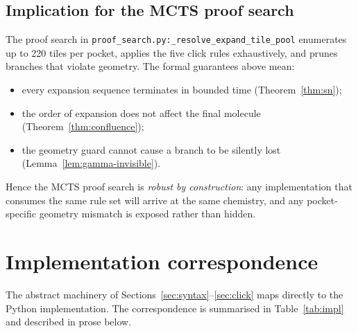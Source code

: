\documentclass{article}
\theoremstyle{definition}
\begin{document}
\subsection{Implication for the MCTS proof search}
The proof search in \texttt{proof\_search.py:\_resolve\_expand\_tile\_pool}
enumerates up to 220 tiles per pocket, applies the five click rules
exhaustively, and prunes branches that violate geometry. The
formal guarantees above mean:
\begin{itemize}
  \item every expansion sequence terminates in bounded time
        (Theorem~\ref{thm:sn});
  \item the order of expansion does not affect the final molecule
        (Theorem~\ref{thm:confluence});
  \item the geometry guard cannot cause a branch to be silently lost
        (Lemma~\ref{lem:gamma-invisible}).
\end{itemize}
Hence the MCTS proof search is \emph{robust by construction}: any
implementation that consumes the same rule set will arrive at the same
chemistry, and any pocket-specific geometry mismatch is exposed rather
than hidden.

\section{Implementation correspondence}
\label{sec:impl}
The abstract machinery of Sections~\ref{sec:syntax}--\ref{sec:click} maps
directly to the Python implementation. The correspondence is summarised in
Table~\ref{tab:impl} and described in prose below.
\end{document}
